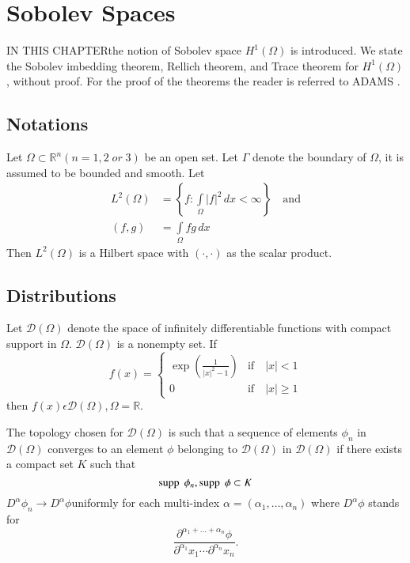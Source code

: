 
\chapter{Sobolev Spaces}\label{chap1}

IN THIS CHAPTER\pageoriginale the notion of Sobolev space $H^1(\Omega)$ is
introduced. We state the Sobolev imbedding theorem, Rellich theorem,
and Trace theorem for $H^1(\Omega)$, without proof. For the proof of
the theorems the reader is referred to ADAMS \cite{key1}.

\section{Notations}\label{chap1:subsec1.1} 
Let $\Omega\subset \mathbb{R}^n(n=1, 2\; or\; 3)$ be an open set. Let $\Gamma$
denote the boundary of $\Omega$, it is assumed to be bounded and
smooth. Let 
\begin{align*}
L^2(\Omega)&=\left\{f:\int\limits_\Omega|f|^2\,dx <\infty\right\} \quad \text{and}\\
(f, g)&=\int\limits_\Omega fg \,dx
\end{align*}
Then $L^2(\Omega)$ is a Hilbert space with $(\cdotp,\cdotp)$ as the
scalar product.

\section{Distributions}\label{chap1:subsec1.2}
Let $\mathscr{D}(\Omega)$ denote the space of infinitely
differentiable functions with compact support in
$\Omega$. $\mathscr{D}(\Omega)$ is a nonempty set. If 
\begin{equation*}
f(x)= 
\begin{cases}
\exp\left(\frac{1}{|x|^2-1}\right) & \text{if}\quad |x|<1\\
0 & \text{if}\quad |x|\geq 1
\end{cases}
\end{equation*}
then $f(x) \epsilon\mathscr{D}(\Omega),\Omega=\mathbb{R}$. 

The topology chosen for $\mathscr{D}(\Omega)$ is such that a sequence
of elements $\phi_n$ in $\mathscr{D}(\Omega)$ converges to an element
$\phi$ belonging to $\mathscr{D}(\Omega)$ in $\mathscr{D}(\Omega)$ if
there exists a compact set $K$ such that 
$$
\operatorname{supp} \;\phi_n, \operatorname{supp} \;\phi\subset K
$$ 
$D^\alpha \phi_n\to D^\alpha \phi$\pageoriginale uniformly for each
multi-index $\alpha =(\alpha_1,\ldots,\alpha_n)$ where $D^\alpha\phi$
stands for 
$$
\frac{\partial^{{\alpha}_1+\ldots +{\alpha}_n}\phi}
     {\partial^{\alpha_1}x_1\cdots\partial^{\alpha_n}x_n}.
$$


